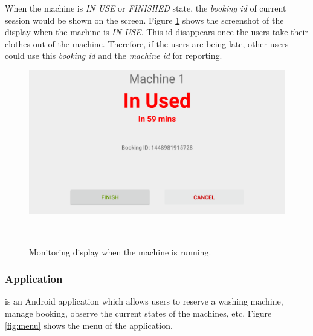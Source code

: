 When the machine is \emph{IN USE} or \emph{FINISHED} state, the \emph{booking id} of current session would be shown on the screen. Figure \ref{fig:figure3} shows the screenshot of the display when the machine is \emph{IN USE}. This id disappears once the users take their clothes out of the machine. Therefore, if the users are being late, other users could use this \emph{booking id} and the \emph{machine id} for reporting.
\begin{figure}[h]
\centering
  \includegraphics[width=0.8\columnwidth]{figures/inuse}
  \caption{Monitoring display when the machine is running.}~\label{fig:figure3}
\end{figure}
\subsubsection{{\toolname} Application}
{\toolname} is an Android application which allows users to reserve a washing machine, manage booking, observe the current states of the machines, etc. Figure \ref{fig:menu} shows the menu of the application.

